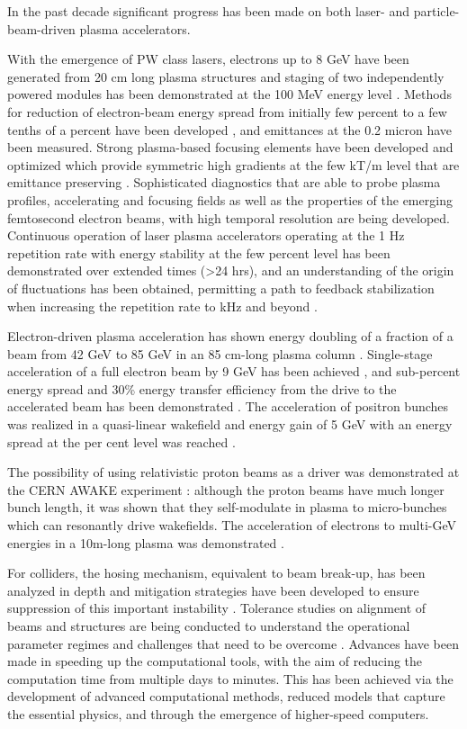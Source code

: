 In the past decade significant progress has been made on both laser- and particle-beam-driven plasma accelerators.

 With the emergence of PW class lasers, electrons up to 8 GeV have been generated from 20 cm long plasma structures \cite{wim2} and staging of two independently powered modules has been demonstrated at the 100 MeV energy level \cite{wim3}. Methods for reduction of electron-beam energy spread from initially few percent to a few tenths of a percent have been developed \cite{wim4,wim5}, and emittances at the 0.2 micron have been measured. Strong plasma-based focusing elements have been developed and optimized which provide symmetric high gradients at the few kT/m level \cite{wim6,wim7,wim8} that are emittance preserving \cite{wim9}. Sophisticated diagnostics that are able to probe plasma profiles, accelerating and focusing fields as well as the properties of the emerging femtosecond electron beams, with high temporal resolution \cite{wim10} are being developed. Continuous operation of laser plasma accelerators operating at the 1 Hz repetition rate with energy stability at the few percent level has been demonstrated over extended times (>24 hrs), and an understanding of the origin of fluctuations has been obtained, permitting a path to feedback stabilization when increasing the repetition rate to kHz and beyond \cite{wim11}.

 Electron-driven plasma acceleration has shown energy doubling of a fraction of a beam from 42 GeV to 85 GeV in an 85 cm-long plasma column \cite{wim12}. Single-stage acceleration of a full electron beam by 9 GeV has been achieved \cite{wim13}, and sub-percent energy spread and 30\% energy transfer efficiency from the drive to the accelerated beam has been demonstrated \cite{wim14}. The acceleration of positron bunches was realized in a quasi-linear wakefield \cite{wim15} and energy gain of 5 GeV with an energy spread at the per cent level was reached \cite{wim16}.

 The possibility of using relativistic proton beams as a driver was demonstrated at the CERN AWAKE experiment \cite{wim17}: although the proton beams have much longer bunch length, it was shown \cite{wim18,wim19} that they self-modulate in plasma to micro-bunches which can resonantly drive wakefields. The acceleration of electrons to multi-GeV energies in a 10m-long plasma was demonstrated \cite{wim17}.

For colliders, the hosing mechanism, equivalent to beam break-up, has been analyzed in depth and mitigation strategies have been developed to ensure suppression of this important instability \cite{wim20,wim21}. Tolerance studies on alignment of beams and structures are being conducted to understand the operational parameter regimes and challenges that need to be overcome \cite{wim22}. Advances have been made in speeding up the computational tools, with the aim of reducing the computation time from multiple days to minutes. This has been achieved via the development of advanced computational methods, reduced models that capture the essential physics, and through the emergence of higher-speed computers.

